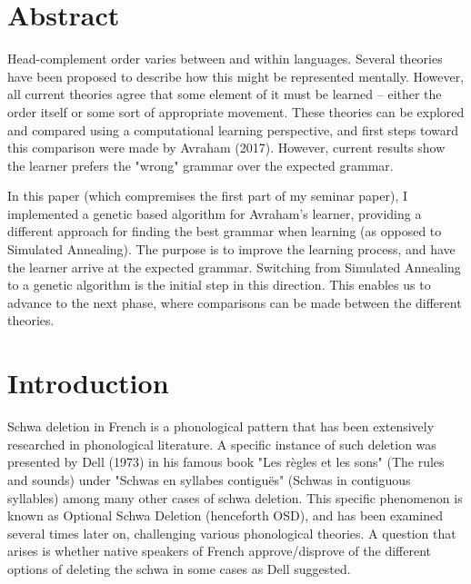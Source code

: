 \documentclass{article}
\begin{document}
\section*{Abstract}
{\sffamily\small

Head-complement order varies between and within languages. Several theories have been proposed to describe how this might be represented mentally. However, all current theories agree that some element of it must be learned – either the order itself or some sort of appropriate movement.
These theories can be explored and compared using a computational learning perspective, and first steps toward this comparison were made by Avraham (2017). However, current results show the learner prefers the "wrong" grammar over the expected grammar.

In this paper (which compremises the first part of my seminar paper), I implemented a genetic based algorithm for Avraham's learner, providing a different approach for finding the best grammar when learning (as opposed to Simulated Annealing).
The purpose is to improve the learning process, and have the learner arrive at the expected grammar.  Switching from Simulated Annealing to a genetic algorithm is the initial step in this direction.
This enables us to advance to the next phase, where comparisons can be made between the different theories.
}

\section{Introduction} %
Schwa deletion in French is a phonological pattern that has been extensively researched in phonological literature. A specific instance of such deletion was presented by Dell (1973) in his famous book "Les règles et les sons" (The rules and sounds) under "Schwas en syllabes contiguës" (Schwas in contiguous syllables) among many other cases of schwa deletion. This specific phenomenon is known as Optional Schwa Deletion (henceforth OSD), and has been examined several times later on,  challenging various phonological theories. A question that arises is whether native speakers of French approve/disprove of the different options of deleting the schwa in some cases as Dell suggested.\\
\end{document}
